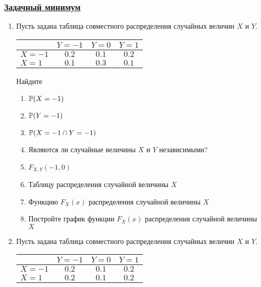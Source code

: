 \newpage
\subsubsection*{\hyperref[sec:sol_minimum_kr_02]{Задачный минимум}}\label{sec:minimum_kr_02}

\begin{enumerate}
\item Пусть задана таблица совместного распределения случайных величин $X$ и $Y$.

\begin{center}
\begin{tabular}{lccc}
\toprule
                       & $Y=-1$  & $Y=0$   & $Y=1$   \\ \midrule
$X=-1$                 & $0.2$ & $0.1$ & $0.2$ \\
 $X=1$                 & $0.1$ & $0.3$ & $0.1$ \\ \bottomrule
\end{tabular}
\end{center}

Найдите
\begin{enumerate}
\item $\P(X = -1)$
\item $\P(Y = -1)$
\item $\P(X = -1 \cap Y = -1 )$
\item Являются ли случайные величины $X$ и $Y$ независимыми?
\item $F_{X,Y}(-1,0)$
\item Таблицу распределения случайной величины $X$
\item Функцию $F_{X}(x)$ распределения случайной величины $X$
\item Постройте график функции $F_{X}(x)$ распределения случайной величины $X$
\end{enumerate}

\item Пусть задана таблица совместного распределения случайных величин $X$ и $Y$.

\begin{center}
\begin{tabular}{lccc}
\toprule
                       & $Y=-1$  & $Y=0$  & $Y=1$   \\ \midrule
$X=-1$                 & $0.2$ & $0.1$ & $0.2$ \\
 $X=1$                 & $0.2$ & $0.1$ & $0.2$ \\ \bottomrule
\end{tabular}
\end{center}


\end{enumerate}
